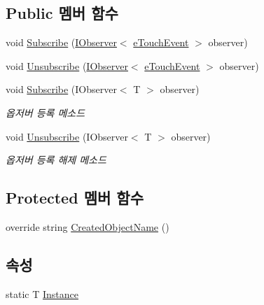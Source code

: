 \subsection*{Public 멤버 함수}
\begin{DoxyCompactItemize}
\item 
void \hyperlink{class_touch_manager_aa68342b07f75f8eda3b420e07f9e4c7b}{Subscribe} (\hyperlink{interface_m_c_n_1_1_i_observer}{I\+Observer}$<$ \hyperlink{_touch_manager_8cs_ae33e321a424fe84ba8b2fdb81ad40a68}{e\+Touch\+Event} $>$ observer)
\item 
void \hyperlink{class_touch_manager_a2c4ace4b27bef64c2e9496240ee4d676}{Unsubscribe} (\hyperlink{interface_m_c_n_1_1_i_observer}{I\+Observer}$<$ \hyperlink{_touch_manager_8cs_ae33e321a424fe84ba8b2fdb81ad40a68}{e\+Touch\+Event} $>$ observer)
\item 
void \hyperlink{interface_m_c_n_1_1_i_observable_a84e57296a612a2d49afbcc7f841ceb0b}{Subscribe} (I\+Observer$<$ T $>$ observer)
\begin{DoxyCompactList}\small\item\em 옵저버 등록 메소드 \end{DoxyCompactList}\item 
void \hyperlink{interface_m_c_n_1_1_i_observable_a3ff752d344f0b610b1146af7a0fbf067}{Unsubscribe} (I\+Observer$<$ T $>$ observer)
\begin{DoxyCompactList}\small\item\em 옵저버 등록 해제 메소드 \end{DoxyCompactList}\end{DoxyCompactItemize}
\subsection*{Protected 멤버 함수}
\begin{DoxyCompactItemize}
\item 
override string \hyperlink{class_touch_manager_a8fb5460d8904a0c1a6453b5c49dc3cb4}{Created\+Object\+Name} ()
\end{DoxyCompactItemize}
\subsection*{속성}
\begin{DoxyCompactItemize}
\item 
static T \hyperlink{class_m_c_n_1_1_mono_singletone_aa50c027cca64cf4ad30c1ee5c83e0b78}{Instance}
\end{DoxyCompactItemize}
